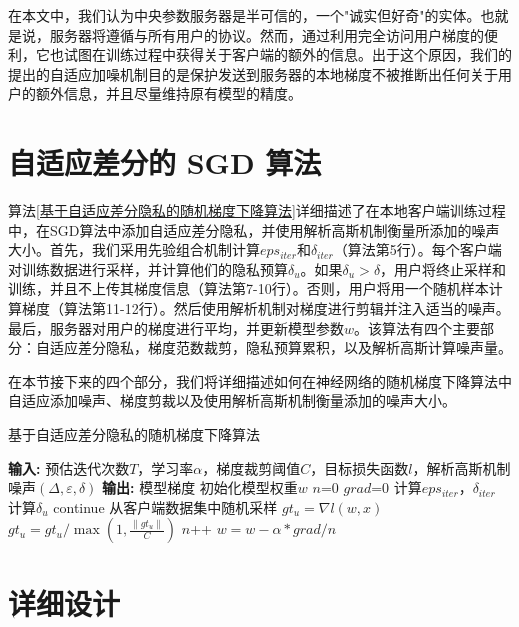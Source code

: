 在本文中，我们认为中央参数服务器是半可信的，一个"诚实但好奇"的实体。也就是说，服务器将遵循与所有用户的协议。然而，通过利用完全访问用户梯度的便利，它也试图在训练过程中获得关于客户端的额外的信息。出于这个原因，我们的提出的自适应加噪机制目的是保护发送到服务器的本地梯度不被推断出任何关于用户的额外信息，并且尽量维持原有模型的精度。

\section{自适应差分的 SGD 算法}

算法\ref{基于自适应差分隐私的随机梯度下降算法}详细描述了在本地客户端训练过程中，在SGD算法中添加自适应差分隐私，并使用解析高斯机制衡量所添加的噪声大小。首先，我们采用先验组合机制计算$eps_{iter}$和$\delta_{iter}$（算法第5行）。每个客户端对训练数据进行采样，并计算他们的隐私预算$\delta_{u}$。如果$\delta_{u}>\delta$，用户将终止采样和训练，并且不上传其梯度信息（算法第7-10行）。否则，用户将用一个随机样本计算梯度（算法第11-12行）。然后使用解析机制对梯度进行剪辑并注入适当的噪声。最后，服务器对用户的梯度进行平均，并更新模型参数$w$。该算法有四个主要部分：自适应差分隐私，梯度范数裁剪，隐私预算累积，以及解析高斯计算噪声量。

在本节接下来的四个部分，我们将详细描述如何在神经网络的随机梯度下降算法中自适应添加噪声、梯度剪裁以及使用解析高斯机制衡量添加的噪声大小。

\newpage

\begin{algorithm}[!htb]
	\caption{基于自适应差分隐私的随机梯度下降算法}
	\label{基于自适应差分隐私的随机梯度下降算法}
	\begin{algorithmic}[1]
		\footnotesize
		\STATE \textbf{输入:} 预估迭代次数$T$，学习率$\alpha$，梯度裁剪阈值$C$，目标损失函数$l$，解析高斯机制噪声$(\Delta, \varepsilon, \delta)$
		\STATE \textbf{输出:} 模型梯度
		\STATE 初始化模型权重$w$
			\STATE $n$=0
			\STATE $grad$=0
			\STATE 计算$eps_{iter}$，$\delta_{iter}$
				\STATE 计算$\delta_{u}$
					\STATE continue
				\ENDIF
				\STATE 从客户端数据集中随机采样
				\STATE $g t_{u}=\nabla l(w, x)$
				\STATE $g t_{u}=g t_{u} / \max \left(1, \frac{\left\|g t_{u}\right\|}{C}\right)$
				\STATE $n$++
			\ENDFOR
			$w=w-\alpha * g r a d / n$
		\ENDWHILE
	\end{algorithmic}
\end{algorithm}

\section{详细设计}
